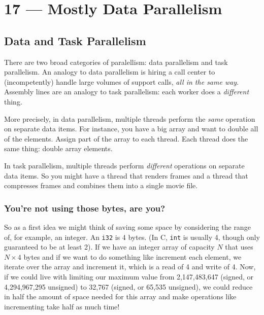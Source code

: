 \documentclass[a4paper]{report}
\begin{document}
\chapter*{17 --- Mostly Data Parallelism}



\section*{Data and Task Parallelism}
There are two broad categories of paralellism: data parallelism and
task parallelism. An analogy to data parallelism is hiring a call
center to (incompetently) handle large volumes of support calls,
\emph{all in the same way}. Assembly lines are an analogy to task
parallelism: each worker does a \emph{different} thing.

More precisely, in data parallelism, multiple threads perform the
\emph{same} operation on separate data items. For instance, you have a
big array and want to double all of the elements. Assign part of the
array to each thread. Each thread does the same thing: double array
elements.

In task parallelism, multiple threads perform \emph{different}
operations on separate data items. So you might have a thread that
renders frames and a thread that compresses frames and combines them
into a single movie file.


\subsection*{You're not using those bytes, are you?}
So as a first idea we might think of saving some space by considering the range of, for example, an integer. An \texttt{i32} is 4 bytes. (In C, \texttt{int} is usually 4, though only guaranteed to be at least 2). If we have an integer array of capacity $N$ that uses $N \times 4$ bytes and if we want to do something like increment each element, we iterate over the array and increment it, which is a read of 4 and write of 4. Now, if we could live with limiting our maximum value from 2,147,483,647 (signed, or 4,294,967,295 unsigned) to 32,767  (signed, or 65,535 unsigned), we could reduce in half the amount of space needed for this array and make operations like incrementing take half as much time!
\end{document}
